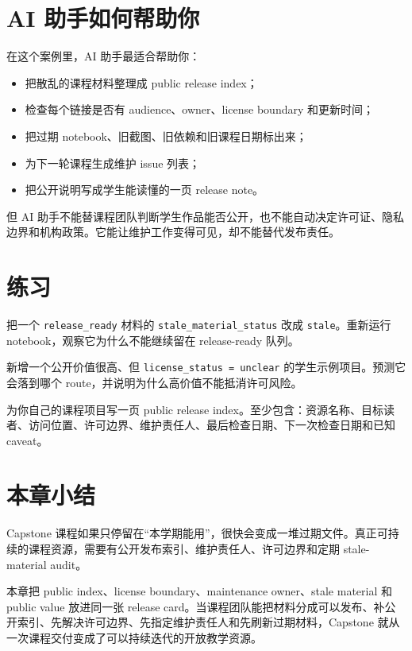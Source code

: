 \section{AI 助手如何帮助你}

在这个案例里，AI 助手最适合帮助你：

\begin{itemize}
    \item 把散乱的课程材料整理成 public release index；
    \item 检查每个链接是否有 audience、owner、license boundary 和更新时间；
    \item 把过期 notebook、旧截图、旧依赖和旧课程日期标出来；
    \item 为下一轮课程生成维护 issue 列表；
    \item 把公开说明写成学生能读懂的一页 release note。
\end{itemize}

但 AI 助手不能替课程团队判断学生作品能否公开，也不能自动决定许可证、隐私边界和机构政策。它能让维护工作变得可见，却不能替代发布责任。

\section{练习}

\begin{exercisebox}[基础练习]
把一个 \texttt{release\_ready} 材料的 \texttt{stale\_material\_status} 改成 \texttt{stale}。重新运行 notebook，观察它为什么不能继续留在 release-ready 队列。
\end{exercisebox}

\begin{exercisebox}[进阶练习]
新增一个公开价值很高、但 \texttt{license\_status = unclear} 的学生示例项目。预测它会落到哪个 route，并说明为什么高价值不能抵消许可风险。
\end{exercisebox}

\begin{exercisebox}[开放练习]
为你自己的课程项目写一页 public release index。至少包含：资源名称、目标读者、访问位置、许可边界、维护责任人、最后检查日期、下一次检查日期和已知 caveat。
\end{exercisebox}

\section{本章小结}

Capstone 课程如果只停留在“本学期能用”，很快会变成一堆过期文件。真正可持续的课程资源，需要有公开发布索引、维护责任人、许可边界和定期 stale-material audit。

本章把 public index、license boundary、maintenance owner、stale material 和 public value 放进同一张 release card。当课程团队能把材料分成可以发布、补公开索引、先解决许可边界、先指定维护责任人和先刷新过期材料，Capstone 就从一次课程交付变成了可以持续迭代的开放教学资源。
